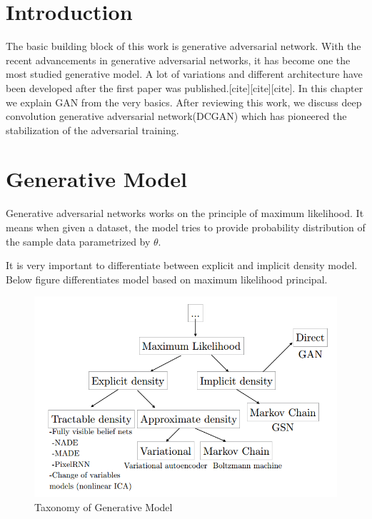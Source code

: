 

\section{Introduction}

The basic building block of this work is generative adversarial network. With the recent advancements in generative adversarial networks, it has become one the most studied generative model. A lot of variations and different architecture have been developed after the first paper was published.[cite][cite][cite]. In this chapter we explain GAN from the very basics. After reviewing this work, we discuss deep convolution generative adversarial network(DCGAN) which has pioneered the stabilization of the adversarial training.

\section{Generative Model}

Generative adversarial networks works on the principle of maximum likelihood.
It means when given a dataset, the model tries to provide probability distribution of the sample data parametrized by $\theta$. %
\par
It is very important to differentiate between explicit and implicit density model. Below figure differentiates model based on maximum likelihood principal.
%
\begin{figure}[h]
    
    \includegraphics[scale=.6, angle=0]{Files/taxanomy.png}
    \caption[The panther]{Taxonomy of Generative Model\cite{GanTut}}
    \label{fig: jordan}
\end{figure}

